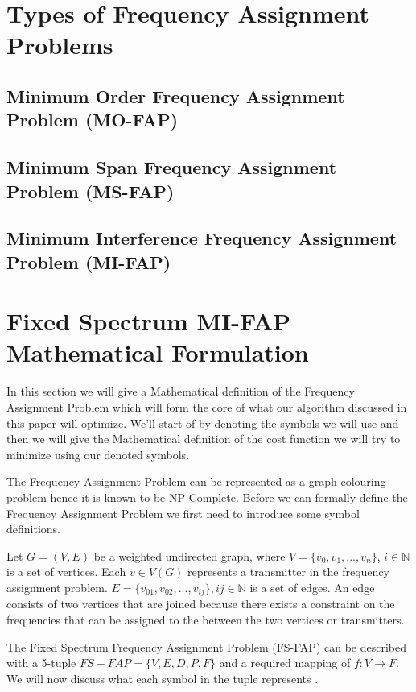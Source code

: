 \section{Types of Frequency Assignment Problems}
\subsection{Minimum Order Frequency Assignment Problem (MO-FAP)}
\subsection{Minimum Span Frequency Assignment Problem (MS-FAP)}
\subsection{Minimum Interference Frequency Assignment Problem (MI-FAP)}
\section{Fixed Spectrum MI-FAP Mathematical Formulation}
In this section we will give a Mathematical definition of the Frequency Assignment Problem which will form the core of what our algorithm discussed in this paper will optimize. We'll start of by denoting the symbols we will use and then we will give the Mathematical definition of the cost function we will try to minimize using our denoted symbols.

The Frequency Assignment Problem can be represented as a graph colouring problem hence it is known to be NP-Complete. Before we can formally define the Frequency Assignment Problem we first need to introduce some symbol definitions.

Let \(G = (V,E)\) be a weighted undirected graph, where \(V = \{v_0,v_1,...,v_n\}\), \(i \in \mathbb{N}\) is a set of vertices. Each \(v \in V(G)\) represents a transmitter in the frequency assignment problem. \(E = \{v_{01},v_{02},...,v_{ij}\}, ij \in \mathbb{N}\) is a set of edges. An edge consists of two vertices that are joined because there exists a constraint on the frequencies that can be assigned to the between the two vertices or transmitters. 

The Fixed Spectrum Frequency Assignment Problem (FS-FAP) can be described with a 5-tuple \(FS-FAP = \{V,E,D,P,F\}\) and a required mapping of \(f: V \rightarrow F\). We will now discuss what each symbol in the tuple represents \cite{TabuMontemanniSmith}.

